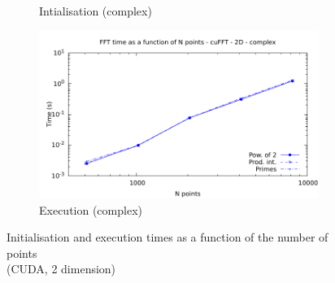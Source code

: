 \documentclass[12pt, a4paper]{article}
\begin{document}
\begin{figure}[H]
\begin{subfigure}{.5\textwidth}
\caption{Intialisation (complex)}
\label{FFTCUDA2DCI}
\end{subfigure}%
\begin{subfigure}{.5\textwidth}
\centering
\includegraphics[width=.9\linewidth]{graphs/fft-cuda-2d-pow2-c-exec.pdf}
\caption{Execution (complex)}
\label{FFTCUDA2DCE}
\end{subfigure}
\caption{Initialisation and execution times as a function of the number of points\\(CUDA, 2 dimension)}
\label{FFTCUDA2D}
\end{figure}
\end{document}
